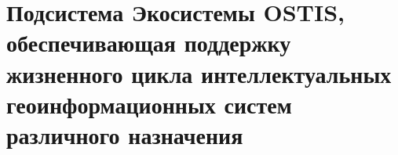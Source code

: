\chapter{Подсистема Экосистемы OSTIS, обеспечивающая поддержку жизненного цикла интеллектуальных геоинформационных систем различного назначения}
\label{chapter_gis}


%